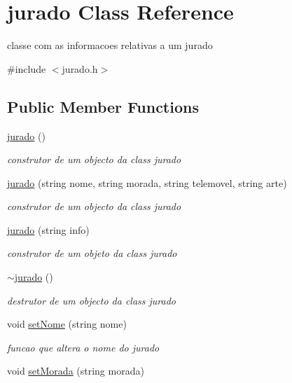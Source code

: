 \hypertarget{classjurado}{}\section{jurado Class Reference}
\label{classjurado}


classe com as informacoes relativas a um jurado  




{\ttfamily \#include $<$jurado.\+h$>$}

\subsection*{Public Member Functions}
\begin{DoxyCompactItemize}
\item 
\hyperlink{classjurado_a9677e0aa464ceeb5b7ad73c6425f5aba}{jurado} ()
\begin{DoxyCompactList}\small\item\em construtor de um objecto da class jurado \end{DoxyCompactList}\item 
\hyperlink{classjurado_ac1743fdba044e673ef7d572763d3d23a}{jurado} (string nome, string morada, string telemovel, string arte)
\begin{DoxyCompactList}\small\item\em construtor de um objecto da class jurado \end{DoxyCompactList}\item 
\hyperlink{classjurado_a5e43e7112be419c57122dba488de3b46}{jurado} (string info)
\begin{DoxyCompactList}\small\item\em construtor de um objeto da class jurado \end{DoxyCompactList}\item 
\hyperlink{classjurado_abe6cb3aaffde689138379457ea881fa7}{$\sim$jurado} ()
\begin{DoxyCompactList}\small\item\em destrutor de um objecto da class jurado \end{DoxyCompactList}\item 
void \hyperlink{classjurado_a017b6f4965237e7bf8009a1bdbead43b}{set\+Nome} (string nome)
\begin{DoxyCompactList}\small\item\em funcao que altera o nome do jurado \end{DoxyCompactList}\item 
void \hyperlink{classjurado_a8dbe8d5f9d9d4bcc03c5e074068d98a7}{set\+Morada} (string morada)

\end{DoxyCompactItemize}

